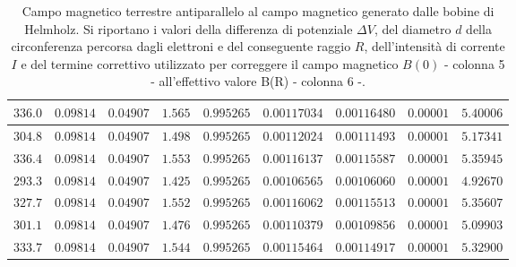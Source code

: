 \documentclass[]{article}
\begin{document}
\begin{table}
\begin{tabular}{||c|c|c|c|c|c|c|c|c||}
    $336.0$ & $0.09814$ & $0.04907$ & $1.565$ & $0.995265$ & $0.00117034$ & $0.00116480$ & $0.00001$ & $5.40006$ \\\hline
    $304.8$ & $0.09814$ & $0.04907$ & $1.498$ & $0.995265$ & $0.00112024$ & $0.00111493$ & $0.00001$ & $5.17341$ \\\hline
    $336.4$ & $0.09814$ & $0.04907$ & $1.553$ & $0.995265$ & $0.00116137$ & $0.00115587$ & $0.00001$ & $5.35945$ \\\hline
    $293.3$ & $0.09814$ & $0.04907$ & $1.425$ & $0.995265$ & $0.00106565$ & $0.00106060$ & $0.00001$ & $4.92670$ \\\hline
    $327.7$ & $0.09814$ & $0.04907$ & $1.552$ & $0.995265$ & $0.00116062$ & $0.00115513$ & $0.00001$ & $5.35607$ \\\hline
    $301.1$ & $0.09814$ & $0.04907$ & $1.476$ & $0.995265$ & $0.00110379$ & $0.00109856$ & $0.00001$ & $5.09903$ \\\hline
    $333.7$ & $0.09814$ & $0.04907$ & $1.544$ & $0.995265$ & $0.00115464$ & $0.00114917$ & $0.00001$ & $5.32900$ \\\hline

\end{tabular}
    \caption{Campo magnetico terrestre antiparallelo al campo magnetico generato dalle bobine di Helmholz. Si riportano i valori della differenza di potenziale $\Delta V$, del diametro $ d $ della circonferenza percorsa dagli elettroni e del conseguente raggio $ R $, dell'intensità di corrente $ I $ e del termine correttivo utilizzato per correggere il campo magnetico $B(0)$ - colonna 5 - all'effettivo valore B(R) - colonna 6 -.}
    \label{CM_antiparallelo}
\end{table}
\end{document}
